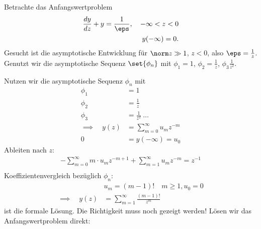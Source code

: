 \begin{beispiel}\label{ex:3-4}
  Betrachte das Anfangswertproblem
  \begin{align*}
    \frac{dy}{dz} + y = \frac 1 \eps, \quad - \infty < z <0\\
    y(- \infty) = 0. 
  \end{align*}
Gesucht ist die asymptotische Entwicklung für $\norm z \gg 1$, $z <0$, also $\eps = \frac 1 z$. Genutzt wir die asymptotische Sequenz $\set{\phi_{n}}$ mit $\phi_{1} = 1$, $\phi_{2} = \frac 1 z$, $\phi_{3} \frac 1 {z^{2}}$. 

Nutzen wir die asymptotische Sequenz $\phi_{n}$ mit
\begin{align*}
  \phi_{1} &= 1\\
  \phi_{2} &= \frac 1z\\
  \phi_{3} &= \frac 1{z^{2}}\ \dots\\
\implies \quad y(z) &= \sum_{m = 0}^{\infty} u_{m} z^{-m}\\
0 &= y(- \infty) = u_{0}
\end{align*}
Ableiten nach $z$: 
\begin{align*}
  -\sum_{m = 0}^{\infty} m\cdot u_{m} z^{-m+1} +\sum_{m = 1}^{\infty} u_{m} z^{-m} = z^{-1}\\
\end{align*}
Koeffizientenvergleich bezüglich $\phi_{n}$:
\begin{align*}
& u_{m} = (m-1)!\quad m\geq 1, u_{0} = 0\\
\implies \quad y(z) &= \sum_{m = 1}^{\infty} \frac{(m-1)!}{z^{m}}
\end{align*}
ist die formale Lösung. Die Richtigkeit muss noch gezeigt werden! Lösen wir das Anfangswertproblem direkt: 


\end{beispiel}
